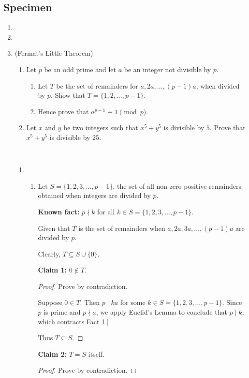 \subsection*{Specimen}
\begin{enumerate}
\item 
\item 
\item (Fermat's Little Theorem)
\begin{enumerate}[label=(\roman*)]
\item Let $p$ be an odd prime and let $a$ be an integer not divisible by $p$.
    \begin{enumerate}[label=(\alph*)]
    \item Let $T$ be the set of remainders for $a,2a,\dots,(p-1)a$, when divided by $p$. Show that $T=\{1,2,\dots,p-1\}$.
    \item Hence prove that $a^{p-1}\equiv1\pmod p$.
    \end{enumerate}
\item Let $x$ and $y$ be two integers such that $x^5+y^5$ is divisible by $5$. Prove that $x^5+y^5$ is divisible by $25$.
\end{enumerate}

\begin{solution} \
\begin{enumerate}[label=(\roman*)]
\item \begin{enumerate}[label=(\alph*)]
    \item Let $S=\{1,2,3,\dots,p-1\}$, the set of all non-zero positive remainders obtained when integers are divided by $p$.
    
    \textbf{Known fact:} $p\nmid k$ for all $k\in S=\{1,2,3,\dots,p-1\}$.

    Given that $T$ is the set of remainders when $a,2a,3a,\dots,(p-1)a$ are divided by $p$.
    
    Clearly, $T\subseteq S\cup\{0\}$.
    
    \textbf{Claim 1:} $0\notin T$.
    \begin{proof}
    Prove by contradiction.

    Suppose $0\in T$. Then $p\mid ka$ for some $k\in S=\{1,2,3,\dots,p-1\}$. Since $p$ is prime and $p\nmid a$, we apply Euclid’s Lemma to conclude that $p\mid k$, which contracts Fact 1.]
    
    Thus $T\subseteq S$.
    \end{proof}
    
    \textbf{Claim 2:} $T=S$ itself.
    \begin{proof}
    Prove by contradiction. 
    

\end{proof}
\end{enumerate}
\end{enumerate}
\end{solution}
\end{enumerate}

